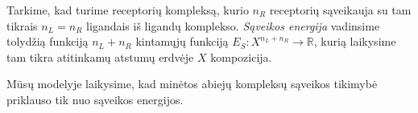 \documentclass[10pt]{article}
\begin{document}
Tarkime, kad turime receptorių kompleksą, kurio $n_R$ receptorių sąveikauja su tam tikrais $n_L  = n_R$ ligandais iš ligandų komplekso. \textit{Sąveikos energija} vadinsime tolydžią funkciją $n_L+n_R$ kintamųjų funkciją $E_S : X^{n_L+n_R} \to \mathbb{R}$, kurią laikysime  tam tikra atitinkamų atstumų erdvėje $X$ kompozicija.

Mūsų modelyje laikysime, kad minėtos abiejų kompleksų  sąveikos tikimybė priklauso tik nuo  sąveikos energijos. 

 
   






%
%
%
%
%               
%           
%          
\end{document}
